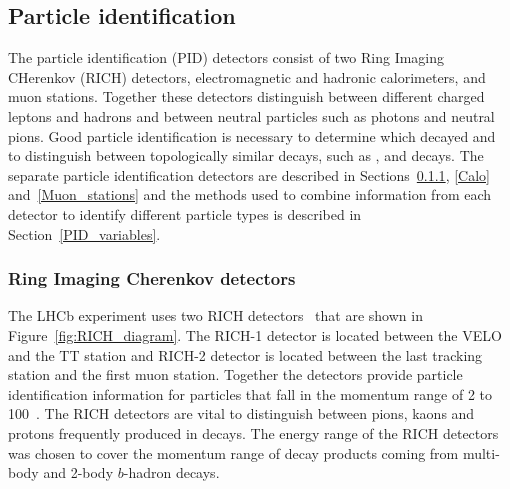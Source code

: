 \subsection{Particle identification}
\label{PID}
The particle identification (PID) detectors consist of two Ring Imaging CHerenkov (RICH) detectors, electromagnetic and hadronic calorimeters, and muon stations. Together these detectors distinguish between different charged leptons and hadrons and between neutral particles such as photons and neutral pions. Good particle identification is necessary to determine which \bhadron decayed and to distinguish between topologically similar decays, such as \bdkpi, \bskk and \bmumu decays. %
The separate particle identification detectors are described in Sections~\ref{RICH}, \ref{Calo} and~\ref{Muon_stations} and the methods used to combine information from each detector to identify different particle types is described in Section~\ref{PID_variables}. 


\subsubsection{Ring Imaging Cherenkov detectors}
\label{RICH}

The LHCb experiment uses two RICH detectors~\cite{Amato:494263,Adinolfi:2012qfa} that are shown in Figure~\ref{fig:RICH_diagram}.
The RICH-1 detector is located between the VELO and the TT station and RICH-2 detector is located between the last tracking station and the first muon station.
 Together the detectors provide particle identification information for particles that fall in the momentum range of 2 to 100~\gevc.
The RICH detectors are vital to distinguish between pions, kaons and protons frequently produced in \bhadron decays. %
The energy range of the RICH detectors was chosen to cover the momentum range of decay products coming from multi-body and 2-body $b$-hadron decays. %

